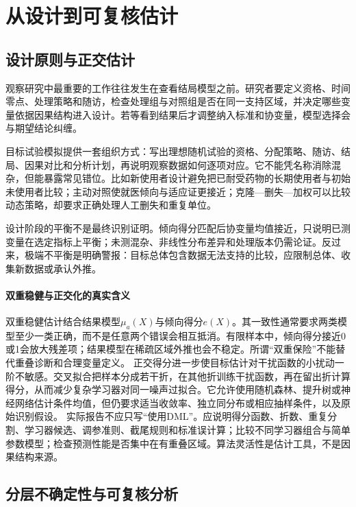 \section{从设计到可复核估计}

\subsection{设计原则与正交估计}

观察研究中最重要的工作往往发生在查看结局模型之前。研究者要定义资格、时间零点、处理策略和随访，检查处理组与对照组是否在同一支持区域，并决定哪些变量依据因果结构进入设计。若等看到结果后才调整纳入标准和协变量，模型选择会与期望结论纠缠。

目标试验模拟提供一套组织方式：写出理想随机试验的资格、分配策略、随访、结局、因果对比和分析计划，再说明观察数据如何逐项对应。它不能凭名称消除混杂，但能暴露常见错位。比如新使用者设计避免把已耐受药物的长期使用者与初始未使用者比较；主动对照使就医倾向与适应证更接近；克隆---删失---加权可以比较动态策略，却要求正确处理人工删失和重复单位。

设计阶段的平衡不是最终识别证明。倾向得分匹配后协变量均值接近，只说明已测变量在选定指标上平衡；未测混杂、非线性分布差异和处理版本仍需论证。反过来，极端不平衡是明确警报：目标总体包含数据无法支持的比较，应限制总体、收集新数据或承认外推。

\paragraph{双重稳健与正交化的真实含义}

双重稳健估计结合结果模型$\mu_a(X)$与倾向得分$e(X)$。其一致性通常要求两类模型至少一类正确，而不是任意两个错误会相互抵消。有限样本中，倾向得分接近0或1会放大残差项；结果模型在稀疏区域外推也会不稳定。所谓“双重保险”不能替代重叠诊断和合理变量定义。
正交得分进一步使目标估计对干扰函数的小扰动一阶不敏感。交叉拟合把样本分成若干折，在其他折训练干扰函数，再在留出折计算得分，从而减少复杂学习器对同一噪声过拟合。它允许使用随机森林、提升树或神经网络估计条件均值，但仍要求适当收敛率、独立同分布或相应抽样条件，以及原始识别假设。
实际报告不应只写“使用DML”。应说明得分函数、折数、重复分割、学习器候选、调参准则、截尾规则和标准误计算；比较不同学习器组合与简单参数模型；检查预测性能是否集中在有重叠区域。算法灵活性是估计工具，不是因果结构来源。

\subsection{分层不确定性与可复核分析}

